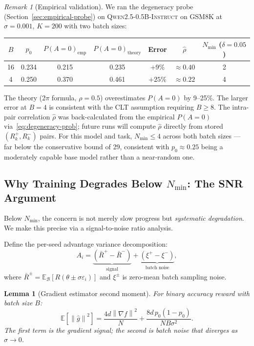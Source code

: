 \documentclass[11pt]{article}
\newtheorem{lemma}{Lemma}
\theoremstyle{definition}
\theoremstyle{remark}
\newtheorem{remark}{Remark}
\newcommand{\E}{\mathbb{E}}
\newcommand{\norm}[1]{\left\|#1\right\|}
\newcommand{\Nmin}{N_{\mathrm{min}}}
\begin{document}
\begin{remark}[Empirical validation]
\label{rem:empirical-nmin}
We ran the degeneracy probe (Section~\ref{sec:empirical-probe}) on \textsc{Qwen2.5-0.5B-Instruct} on GSM8K at $\sigma=0.001$, $K=200$ with two batch sizes:

\begin{center}
\begin{tabular}{ccccccc}
\toprule
$B$ & $p_0$ & $P(A=0)_{\text{emp}}$ & $P(A=0)_{\text{theory}}$ & Error & $\hat\rho$ & $\Nmin$ ($\delta=0.05$)\\
\midrule
16 & 0.234 & 0.215 & 0.235 & $+9\%$ & $\approx 0.40$ & 2\\
4  & 0.250 & 0.370 & 0.461 & $+25\%$ & $\approx 0.22$ & 4\\
\bottomrule
\end{tabular}
\end{center}

The theory (2$\pi$ formula, $\rho=0.5$) overestimates $P(A=0)$ by 9--25\%. The larger error at $B=4$ is consistent with the CLT assumption requiring $B \geq 8$. The intra-pair correlation $\hat\rho$ was back-calculated from the empirical $P(A=0)$ via~\eqref{eq:degeneracy-prob}; future runs will compute $\hat\rho$ directly from stored $(R^+_k, R^-_k)$ pairs. For this model and task, $\Nmin \leq 4$ across both batch sizes --- far below the conservative bound of 29, consistent with $p_0 \approx 0.25$ being a moderately capable base model rather than a near-random one.
\end{remark}

\subsection{Why Training Degrades Below $\Nmin$: The SNR Argument}
\label{sec:snr}

Below $\Nmin$, the concern is not merely slow progress but \emph{systematic degradation}. We make this precise via a signal-to-noise ratio analysis.

Define the per-seed advantage variance decomposition:
\begin{equation}
  A_i = \underbrace{(\bar R^+ - \bar R^-)}_{\text{signal}} + \underbrace{(\xi^+ - \xi^-)}_{\text{batch noise}},
\end{equation}
where $\bar R^\pm = \E_{\mathcal{B}}[R(\theta \pm \sigma\varepsilon_i)]$ and $\xi^\pm$ is zero-mean batch sampling noise.

\begin{lemma}[Gradient estimator second moment]
\label{lem:estimator-variance}
For binary accuracy reward with batch size $B$:
\begin{equation}
  \E\!\left[\norm{\hat{g}}^2\right] = \frac{4d\norm{\nabla f}^2}{N} + \frac{8d\, p_0(1-p_0)}{NB\sigma^2}.
  \label{eq:estimator-variance}
\end{equation}
The first term is the gradient signal; the second is batch noise that diverges as $\sigma \to 0$.
\end{lemma}
\end{document}
